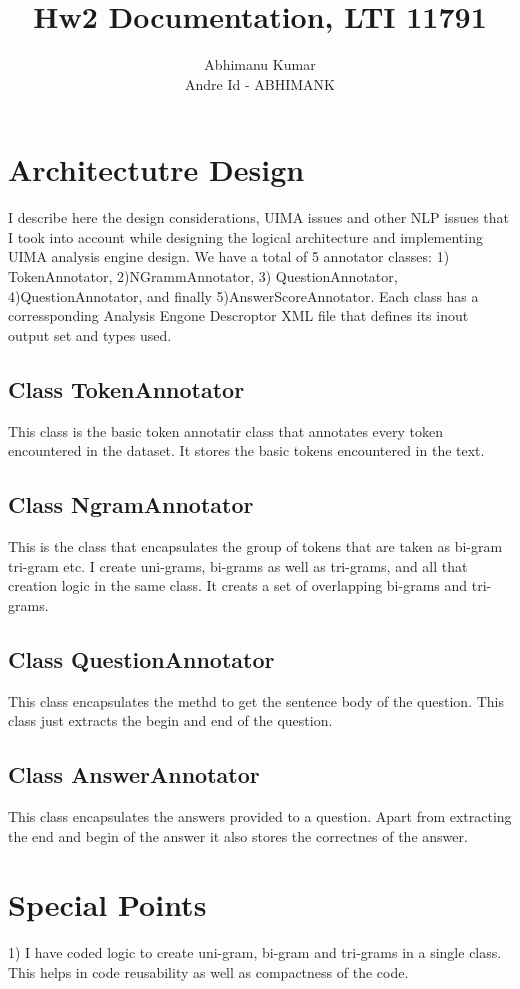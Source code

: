 \documentclass{article}
\title{Hw2 Documentation, LTI 11791}
\author{Abhimanu Kumar \\ Andre Id - ABHIMANK}
\date
\begin{document}
\maketitle

\section{Architectutre Design}
I describe here the design considerations, UIMA issues and other 
NLP issues that I took into account while designing the logical architecture 
and implementing UIMA analysis engine design.
We have a total of 5 annotator classes: 1) TokenAnnotator, 2)NGrammAnnotator,
3) QuestionAnnotator, 4)QuestionAnnotator, and finally 5)AnswerScoreAnnotator.
Each class has a corressponding Analysis Engone Descroptor XML file that
defines its inout output set and types used.

\subsection{Class TokenAnnotator}
This class is the basic token annotatir class that annotates every token 
encountered in the dataset. It stores the basic tokens encountered in the text. 

\subsection{Class NgramAnnotator}
This is the class that encapsulates the group of tokens that are taken as 
bi-gram tri-gram etc. I create uni-grams, bi-grams as well as tri-grams, and 
all that creation logic in the same class. It creats a set of overlapping
bi-grams and tri-grams.


\subsection{Class QuestionAnnotator}
This class encapsulates the methd to get the sentence body of the question. 
This class just extracts the begin and end of the question.
 
\subsection{Class AnswerAnnotator}
This class encapsulates the answers provided to a question. Apart from
extracting the end and begin of the answer it also stores the correctnes of the
answer.

\section{Special Points}
1) I have coded logic to create uni-gram, bi-gram and tri-grams in a single
class. This helps in code reusability as well as compactness of the code.
\end{document}
